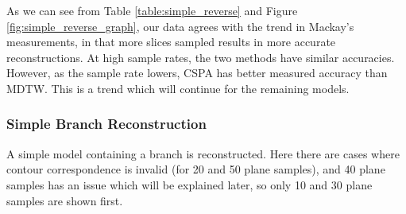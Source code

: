 \documentclass[11p, titlepage]{article}
\begin{document}
As we can see from Table \ref{table:simple_reverse} and Figure \ref{fig:simple_reverse_graph}, our data agrees with the trend in Mackay's measurements, in that more slices sampled results in more accurate reconstructions. At high sample rates, the two methods have similar accuracies. However, as the sample rate lowers, CSPA has better measured accuracy than MDTW. This is a trend which will continue for the remaining models.
\pagebreak

\subsubsection{Simple Branch Reconstruction}

A simple model containing a branch is reconstructed. Here there are cases where contour correspondence is invalid (for 20 and 50 plane samples), and 40 plane samples has an issue which will be explained later, so only 10 and 30 plane samples are shown first.
\end{document}
